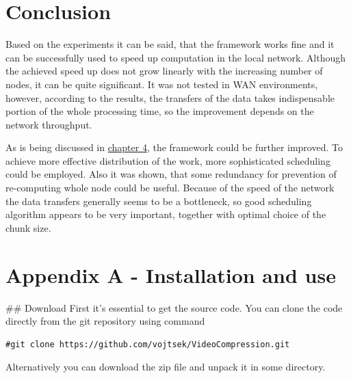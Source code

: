\chapter*{Conclusion}
Based on the experiments it can be said, that the framework works fine and it can be successfully used to speed up computation in the local network. Although the achieved speed up does not grow linearly with the increasing number of nodes, it can be quite significant. It was not tested in WAN environments, however, according to the results, the transfers of the data takes indispensable portion of the whole processing time, so the improvement depends on the network throughput. 

As is being discussed in \hyperref[Problems-alternatives-and-possible-improvements]{chapter 4}, the framework could be further improved. To achieve more effective distribution of the work, more sophisticated scheduling could be employed. Also it was shown, that some redundancy for prevention of re-computing whole node could be useful. Because of the speed of the network the data transfers generally seems to be a bottleneck, so good scheduling algorithm appears to be very important, together with optimal choice of the chunk size.

\chapter*{Appendix A - Installation and use}
## Download 
First it's essential to get the source code. You can clone the code directly from the git repository using command
\begin{verbatim}
#git clone https://github.com/vojtsek/VideoCompression.git
\end{verbatim}
Alternatively you can download the zip file and unpack it in some directory.

